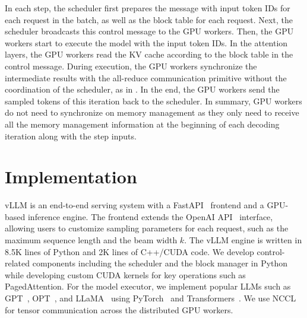 \documentclass[sigplan,10pt]{acmart}
\newcommand{\tech}[0]{PagedAttention\xspace}
\newcommand{\sys}[0]{vLLM\xspace}
\begin{document}
In each step, the scheduler first prepares the message with input token IDs for each request in the batch, as well as the block table for each request. Next, the scheduler broadcasts this control message to the GPU workers. Then, the GPU workers start to execute the model with the input token IDs. In the attention layers, the GPU workers read the KV cache according to the block table in the control message. During execution, the GPU workers synchronize the intermediate results with the all-reduce communication primitive without the coordination of the scheduler, as in \cite{shoeybi2019megatron}. In the end, the GPU workers send the sampled tokens of this iteration back to the scheduler. In summary, GPU workers do not need to synchronize on memory management as they only need to receive all the memory management information at the beginning of each decoding iteration along with the step inputs.

\section{Implementation}
\label{sec:impl}

\begin{table}[tp]\centering\small
\caption{Model sizes and server configurations.}
\vspace{-10pt}
\vspace{-5pt}
\label{table:model_config}
\end{table}


\sys is an end-to-end serving system with a FastAPI~\cite{fastapi} frontend and a GPU-based inference engine.
The frontend extends the OpenAI API~\cite{openaiapi} interface, allowing users to customize sampling parameters for each request, such as the maximum sequence length and the beam width $k$.
The \sys engine is written in 8.5K lines of Python and 2K lines of C++/CUDA code.
We develop control-related components including the scheduler and the block manager in Python while developing custom CUDA kernels for key operations such as \tech.
For the model executor, we implement popular LLMs such as GPT~\cite{brown2020language}, OPT~\cite{zhang2022opt}, and LLaMA~\cite{touvron2023llama} using PyTorch~\cite{paszke2019pytorch} and Transformers~\cite{wolf2020transformers}.
We use NCCL~\cite{nccl} for tensor communication across the distributed GPU workers.
\end{document}
